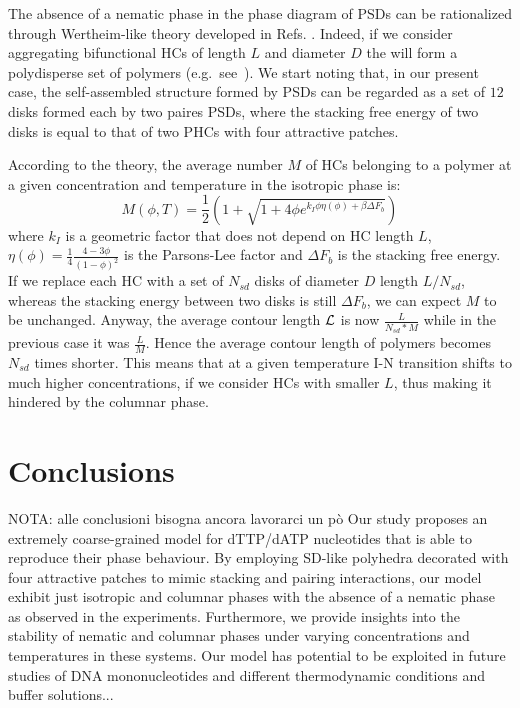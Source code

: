 \documentclass[aip,jcp, amsmath, amssymb, reprint]{revtex4-1}
\begin{document}
The absence of a nematic phase in the phase diagram of PSDs can be rationalized through Wertheim-like
theory developed in Refs. \cite{Bellini}. Indeed, if we consider aggregating bifunctional HCs of 
length $L$ and diameter $D$ the will form a polydisperse set of polymers (e.g.~see~\cite{DeMichele12}).
We start noting that, in our present case, the self-assembled structure formed by PSDs can be regarded 
as a set of $12$ disks formed each by two paires PSDs, where the stacking free energy of two disks is equal to 
that of two PHCs with four attractive patches.

According to the theory, the average number $M$ of HCs belonging to a polymer at a given concentration 
and temperature in the isotropic phase is:
\begin{equation}
M(\phi, T) = \frac{1}{2}\left( 1 + \sqrt{1 + 4 \phi e^{k_I \phi \eta(\phi)+\beta {\Delta F}_b}} \right) 
\end{equation}
where $k_I$ is a geometric factor that does not depend on HC length $L$, 
$\eta(\phi) = \frac{1}{4} \frac{4-3\phi}{{(1-\phi)}^2}$ is the Parsons-Lee factor
and ${\Delta F}_b$ is the stacking free energy.
If we replace each HC with a set of $N_{sd}$ disks of diameter $D$ length $L/N_{sd}$, whereas the stacking energy between two 
disks is still ${\Delta F}_b$, we can expect $M$ to be unchanged. Anyway, the average contour length ${\cal L}$
is now $\frac{L}{N_{sd}*M}$ while in the previous case it was $\frac{L}{M}$.
Hence the average contour length of polymers becomes $N_{sd}$ times shorter. 
This means that at a given temperature I-N transition shifts to much higher concentrations, if we consider HCs with smaller $L$, 
thus making it hindered by the columnar phase.


\section{\label{Dis}Conclusions}
{\color{red} NOTA: alle conclusioni bisogna ancora lavorarci un pò}
Our study proposes an extremely coarse-grained model for dTTP/dATP nucleotides that is able to reproduce their 
phase behaviour. By employing SD-like polyhedra decorated with four attractive patches to mimic
stacking and pairing interactions, our model exhibit just isotropic and columnar phases with the absence of
a nematic phase as observed in the experiments.  Furthermore, we provide insights into the stability 
of nematic and columnar phases under varying concentrations and temperatures in these systems. Our model
has potential to be exploited in future studies of DNA mononucleotides and different thermodynamic conditions
and buffer solutions...
\appendix
\end{document}
